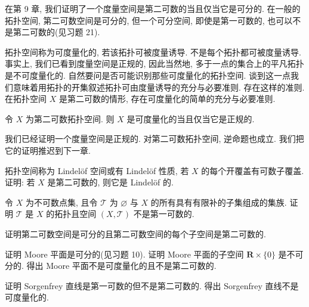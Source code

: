 \documentclass[../../main.tex]{subfiles}
\begin{document}
在第 9 章, 我们证明了一个度量空间是第二可数的当且仅当它是可分的. 在一般的拓扑空间, 第二可数空间是可分的, 但一个可分空间, 即使是第一可数的, 也可以不是第二可数的(见习题 21).

拓扑空间称为可度量化的, 若该拓扑可被度量诱导. 不是每个拓扑都可被度量诱导. 事实上, 我们已看到度量空间是正规的, 因此当然地, 多于一点的集合上的平凡拓扑是不可度量化的. 自然要问是否可能识别那些可度量化的拓扑空间. 谈到这一点我们意味着用拓扑的开集叙述拓扑可由度量诱导的充分与必要准则. 存在这样的准则. 在拓扑空间 $X$ 是第二可数的情形, 存在可度量化的简单的充分与必要准则.

\begin{theorem}\label{theorem:ch11-urysohn度量化}
令 $X$ 为第二可数拓扑空间. 则 $X$ 是可度量化的当且仅当它是正规的.
\end{theorem}

我们已经证明一个度量空间是正规的. 对第二可数拓扑空间, 逆命题也成立. 我们把它的证明推迟到下一章.

\begin{exercise}\label{exercise:ch11-17}
拓扑空间称为 Lindel\"of 空间或有 Lindel\"of 性质, 若 $X$ 的每个开覆盖有可数子覆盖. 证明: 若 $X$ 是第二可数的, 则它是 Lindel\"of 的.
\end{exercise}

\begin{exercise}\label{exercise:ch11-18}
令 $X$ 为不可数点集, 且令 $\mathcal{T}$ 为 $\varnothing$ 与 $X$ 的所有具有有限补的子集组成的集族. 证明 $\mathcal{T}$ 是 $X$ 的拓扑且空间 $(X,\mathcal{T})$ 不是第一可数的.
\end{exercise}

\begin{exercise}\label{exercise:ch11-19}
证明第二可数空间是可分的且第二可数空间的每个子空间是第二可数的.
\end{exercise}

\begin{exercise}\label{exercise:ch11-20}
证明 Moore 平面是可分的(见习题 10). 证明 Moore 平面的子空间 $\mathbf{R}\times\{0\}$ 是不可分的. 得出 Moore 平面不是可度量化的且不是第二可数的.
\end{exercise}

\begin{exercise}\label{exercise:ch11-21}
证明 Sorgenfrey 直线是第一可数的但不是第二可数的. 得出 Sorgenfrey 直线不是可度量化的.
\end{exercise}
\end{document}
